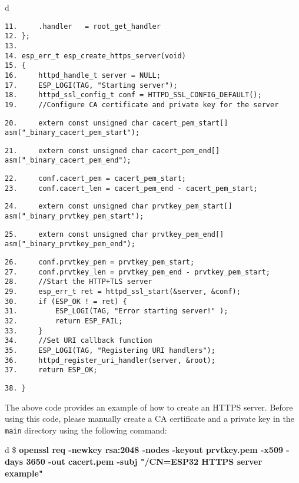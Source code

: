 \documentclass[a4paper,12pt]{book}
\begin{document}
\begin{codebloc}
\begin{tabular}{d}
\vspace{2pt}
\begin{verbatim}
11.     .handler   = root_get_handler
12. };
13.	
14. esp_err_t esp_create_https_server(void)
15. {
16.     httpd_handle_t server = NULL;
17.     ESP_LOGI(TAG, "Starting server");
18.     httpd_ssl_config_t conf = HTTPD_SSL_CONFIG_DEFAULT();
19.     //Configure CA certificate and private key for the server
\end{verbatim}
\verb|20.     |\fontsize{9pt}{10pt}\selectfont\verb|extern const unsigned char cacert_pem_start[] asm("_binary_cacert_pem_start");|

\footnotesize
\verb|21.     |\fontsize{9pt}{10pt}\selectfont\verb|extern const unsigned char cacert_pem_end[] asm("_binary_cacert_pem_end");|
\footnotesize
\begin{verbatim}
22.     conf.cacert_pem = cacert_pem_start;
23.     conf.cacert_len = cacert_pem_end - cacert_pem_start;
\end{verbatim}
\verb|24.     |\fontsize{9pt}{10pt}\selectfont\verb|extern const unsigned char prvtkey_pem_start[] asm("_binary_prvtkey_pem_start");|

\footnotesize
\verb|25.     |\fontsize{9pt}{10pt}\selectfont\verb|extern const unsigned char prvtkey_pem_end[] asm("_binary_prvtkey_pem_end");|
\footnotesize
\begin{verbatim}
26.     conf.prvtkey_pem = prvtkey_pem_start;	
27.     conf.prvtkey_len = prvtkey_pem_end - prvtkey_pem_start;
28.     //Start the HTTP+TLS server
29.     esp_err_t ret = httpd_ssl_start(&server, &conf);
30.     if (ESP_OK ! = ret) {
31.         ESP_LOGI(TAG, "Error starting server!" );
32.         return ESP_FAIL;
33.     }
34.     //Set URI callback function
35.     ESP_LOGI(TAG, "Registering URI handlers");
36.     httpd_register_uri_handler(server, &root);
37.     return ESP_OK;
\end{verbatim}
\verb|38. }|
\end{tabular}
\end{codebloc}

The above code provides an example of how to create an HTTPS server. Before using this code, please manually create a CA certificate and a private key in the \verb|main| directory using the following command:

\begin{codebloc}
\begin{tabular}{d}
\$ \textbf{openssl req -newkey rsa:2048 -nodes -keyout prvtkey.pem -x509 -days 3650 -out cacert.pem -subj "/CN=ESP32 HTTPS server example"}
\end{tabular}
\end{codebloc}
\end{document}
